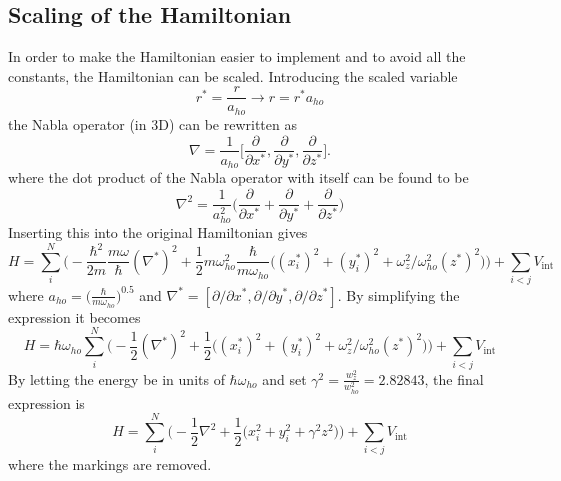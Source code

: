 \subsection{Scaling of the Hamiltonian}
In order to make the Hamiltonian easier to implement and to avoid all the constants, the Hamiltonian can be scaled. Introducing the scaled variable
\begin{equation}
    r^* = \frac{r}{a_{ho}} \rightarrow r = r^* a_{ho}
\end{equation}
the Nabla operator (in 3D) can be rewritten as
\begin{equation}
    \nabla = \frac{1}{a_{ho}}\bigg[\frac{\partial}{\partial x^* }, \frac{\partial }{\partial y^*}, \frac{\partial }{\partial z^*}\bigg].
\end{equation}
where the dot product of the Nabla operator with itself can be found to be 
\begin{equation}
    \nabla^2 = \frac{1}{a_{ho}^2}\bigg(\frac{\partial}{\partial x^*}+ \frac{\partial }{\partial y^*}+ \frac{\partial }{\partial z^*}\bigg)
\end{equation}
Inserting this into the original Hamiltonian gives
\begin{equation}
    H = \sum_i^N \bigg(-\frac{\hbar^2}{2m}\frac{m\omega}{\hbar}(\nabla^*)^2  + \frac{1}{2}m\omega^2_{ho}\frac{\hbar}{m\omega_{ho}}\big((x_i^*)^2 + (y_i^*)^2 + \omega_z^2/\omega_{ho}^2 (z^*)^2\big)\bigg) + \sum_{i<j}V_\text{int}
\end{equation}
where $a_{ho} = \big( \frac{\hbar}{m \omega_{ho}}\big)^{0.5}$ and $\nabla^*  = [\partial/\partial x^*, \partial/\partial y^*, \partial/\partial z^*]$. By simplifying the expression it becomes
\begin{equation}
    H = \hbar \omega_{ho}\sum_i^N \bigg(-\frac{1}{2}(\nabla^*)^2  + \frac{1}{2}\big((x_i^*)^2 + (y_i^*)^2 + \omega_z^2/\omega_{ho}^2 (z^*)^2\big)\bigg) + \sum_{i<j}V_\text{int}
\end{equation}
By letting the energy be in units of $\hbar \omega_{ho}$ and set $\gamma^2 = \frac{w_z^2}{w_{ho}^2} = 2.82843$, the final expression is
\begin{equation}
        H = \sum_i^N \bigg(-\frac{1}{2}\nabla^2  + \frac{1}{2}\big(x_i^2 + y_i^2 + \gamma^2 z^2\big)\bigg) + \sum_{i<j}V_\text{int}
\end{equation}
where the markings are removed.

